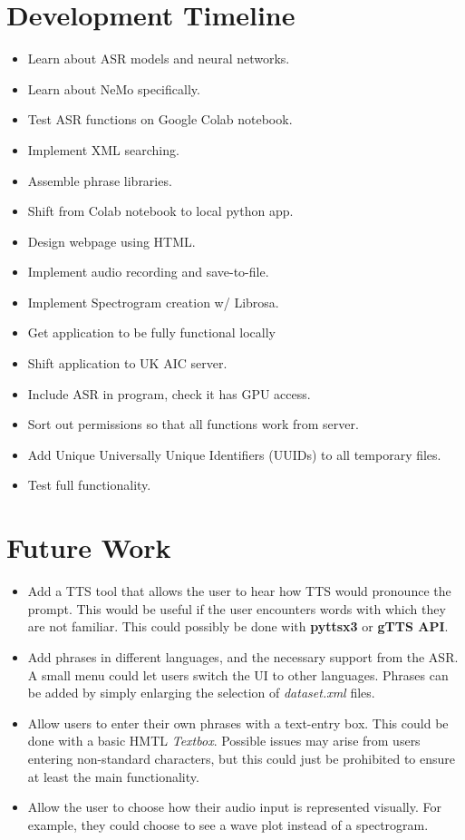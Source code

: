 \documentclass[12pt, letterpaper]{article}
\begin{document}
\section*{Development Timeline}
\begin{itemize}
\item{Learn about ASR models and neural networks.}
\item{Learn about NeMo specifically.}
\item{Test ASR functions on Google Colab notebook.}
\item{Implement XML searching.}
\item{Assemble phrase libraries.}
\item{Shift from Colab notebook to local python app.}
\item{Design webpage using HTML.}
\item{Implement audio recording and save-to-file.}
\item{Implement Spectrogram creation w/ Librosa.}
\item{Get application to be fully functional locally}
\item{Shift application to UK AIC server.}
\item{Include ASR in program, check it has GPU access.}
\item{Sort out permissions so that all functions work from server.}
\item{Add Unique Universally Unique Identifiers (UUIDs) to all temporary files.}
\item{Test full functionality.}
\end{itemize}

\section*{Future Work}
\begin{itemize}
\item{Add a TTS tool that allows the user to hear how TTS would pronounce the prompt. This would be useful if the user encounters words with which they are not familiar. This could possibly be done with \textbf{pyttsx3} or \textbf{gTTS API}.}

\item{Add phrases in different languages, and the necessary support from the ASR. A small menu could let users switch the UI to other languages. Phrases can be added by simply enlarging the selection of \textit{dataset.xml} files.}

\item{Allow users to enter their own phrases with a text-entry box. This could be done with a basic HMTL \textit{Textbox}. Possible issues may arise from users entering non-standard characters, but this could just be prohibited to ensure at least the main functionality.}

\item{Allow the user to choose how their audio input is represented visually. For example, they could choose to see a wave plot instead of a spectrogram.}
\end{itemize}
\end{document}
